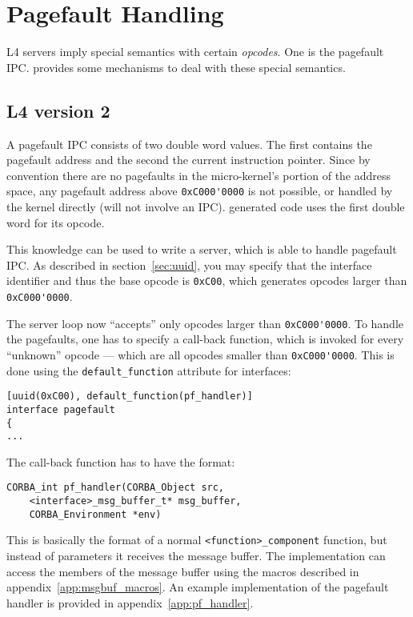 \chapter{Pagefault Handling}
\label{app:pagefault-handling}

L4 servers imply special semantics with certain {\em opcodes}. One is the pagefault
IPC. \dice{} provides some mechanisms to deal with these special semantics.

\section{L4 version 2}
A pagefault IPC consists of two double word values. The first contains the
pagefault address and the second the current instruction pointer. Since by 
convention there are no pagefaults in the micro-kernel's portion of the 
address space, any pagefault address above \verb|0xC000'0000| is not possible,
or handled by the kernel directly (will not involve an IPC). \dice{} generated 
code uses the first double word for its opcode.

This knowledge can be used to write a server, which is able to handle 
pagefault IPC. As described in section~\ref{sec:uuid}, you may specify that
the interface identifier and thus the base opcode is \verb|0xC00|, which
generates opcodes larger than \verb|0xC000'0000|.

The server loop now ``accepts'' only opcodes larger than \verb|0xC000'0000|.
To handle the pagefaults, one has to specify a call-back function, which is
invoked for every ``unknown'' opcode --- which are all opcodes smaller
than \verb|0xC000'0000|. This is done using the \verb|default_function|
attribute for interfaces:

\begin{verbatim}
[uuid(0xC00), default_function(pf_handler)]
interface pagefault
{
...
\end{verbatim}

The call-back function has to have the format:

\begin{verbatim}
CORBA_int pf_handler(CORBA_Object src,
    <interface>_msg_buffer_t* msg_buffer,
    CORBA_Environment *env)
\end{verbatim}

This is basically the format of a normal \verb|<function>_component|
function, but instead of parameters it receives the message buffer.
The implementation can access the members of the message buffer using
the macros described in appendix~\ref{app:msgbuf_macros}. An example
implementation of the pagefault handler is provided in 
appendix~\ref{app:pf_handler}.

